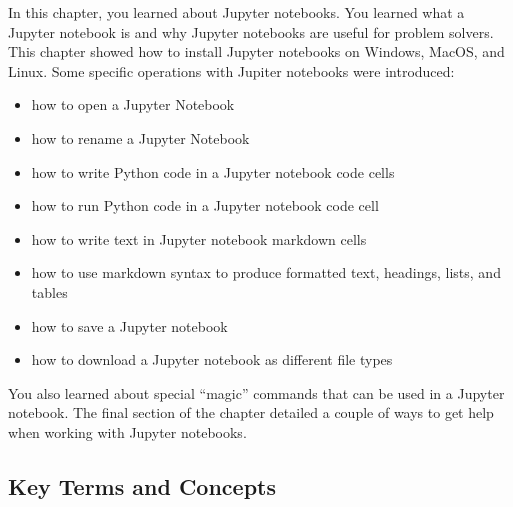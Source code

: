 \documentclass{book}
\providecommand{\tightlist}{%
      \setlength{\itemsep}{0pt}\setlength{\parskip}{0pt}}
\begin{document}
    




    
        In this chapter, you learned about Jupyter notebooks. You learned what a
Jupyter notebook is and why Jupyter notebooks are useful for problem
solvers. This chapter showed how to install Jupyter notebooks on
Windows, MacOS, and Linux. Some specific operations with Jupiter
notebooks were introduced:

\begin{itemize}
\tightlist
\item
  how to open a Jupyter Notebook
\item
  how to rename a Jupyter Notebook
\item
  how to write Python code in a Jupyter notebook code cells
\item
  how to run Python code in a Jupyter notebook code cell
\item
  how to write text in Jupyter notebook markdown cells
\item
  how to use markdown syntax to produce formatted text, headings, lists,
  and tables
\item
  how to save a Jupyter notebook
\item
  how to download a Jupyter notebook as different file types
\end{itemize}

You also learned about special ``magic'' commands that can be used in a
Jupyter notebook. The final section of the chapter detailed a couple of
ways to get help when working with Jupyter notebooks.
    




    
        \subsection{Key Terms and Concepts}\label{key-terms-and-concepts}
    
\end{document}

